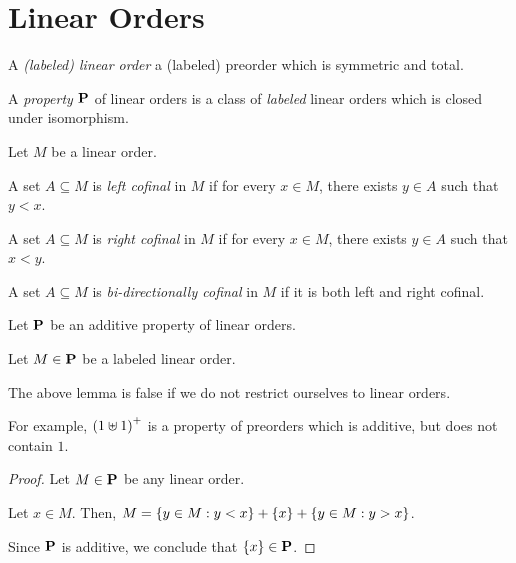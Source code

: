 \section{Linear Orders}

\begin{definitions}
  A \emph{(labeled) linear order} a (labeled) preorder which is symmetric and total.
\end{definitions}

\begin{definition}
  A \emph{property} $\mathbf{P}$ of linear orders is a class of \emph{labeled} linear orders which
  is closed under isomorphism.
\end{definition}

\begin{definition}
  Let $M$ be a linear order.

  A set $A \subseteq M$ is \emph{left cofinal} in $M$ if for every $x \in M$,
  there exists $y \in A$ such that $y < x$.

  A set $A \subseteq M$ is \emph{right cofinal} in $M$ if for every $x \in M$,
  there exists $y \in A$ such that $x < y$.

  A set $A \subseteq M$ is \emph{bi-directionally cofinal} in $M$ if it is both left and right cofinal.
\end{definition}

\begin{lemma}
  Let $\mathbf{P}$ be an additive property of linear orders.
  
  Let $M \in \mathbf{P}$ be a labeled linear order.
\end{lemma}

\begin{note}
  The above lemma is false if we do not restrict ourselves to linear orders.

  For example, $\left( {1 \uplus 1} \right)^+$ is a property of preorders 
  which is additive, but does not contain $1$.
\end{note}

\begin{proof}
  Let $M \in \mathbf{P}$ be any linear order.

  Let $x \in M$. Then,
  $M = \left\{ {y \in M : y < x} \right\} + \left\{ {x} \right\} + \left\{ {y \in M : y > x} \right\}$.

  Since $\mathbf{P}$ is additive, we conclude that $\left\{ {x} \right\} \in \mathbf{P}$.
\end{proof}

